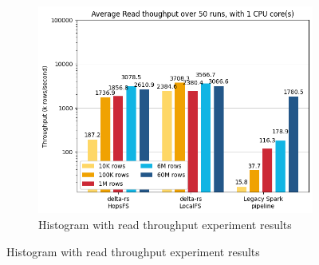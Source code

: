 \begin{figure}
    \centering
    \begin{subfigure}[b]{\textwidth}
        \includegraphics[width=\textwidth]{figures/5-results/read/read_throughput_1_core.png}
        \caption{Histogram with read throughput experiment results}
        \label{fig:res_read_throughput}
    \end{subfigure}
    

\end{figure}
